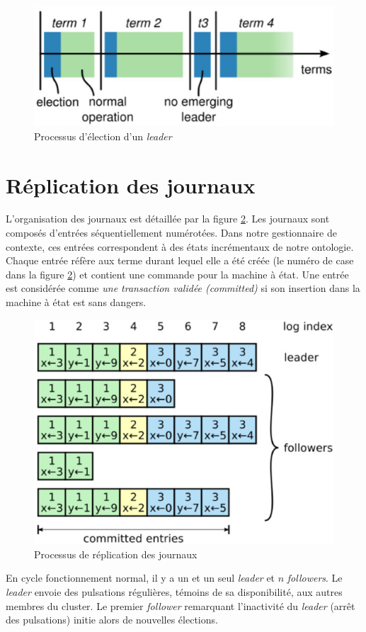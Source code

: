 \begin{figure}[H]
    \centerline{\includegraphics[width=.37\textwidth]{img/leader_election}}
    \caption{Processus d'élection d'un \emph{leader}}
    \label{fig:leader_election}
\end{figure}

\section{Réplication des journaux}

L'organisation des journaux est détaillée par la figure
\ref{fig:log_replication}.  Les journaux sont composés d'entrées
séquentiellement numérotées. Dans notre gestionnaire de contexte, ces entrées
correspondent à des états incrémentaux de notre ontologie. Chaque entrée réfère aux terme
durant lequel elle a été créée (le numéro de case dans la figure
\ref{fig:log_replication}) et contient une commande pour la machine à état. Une
entrée est considérée comme \emph{une transaction validée (committed)} si son
insertion dans la machine à état est sans dangers.

\begin{figure}[H]
    \centerline{\includegraphics[width=.37\textwidth]{img/log_replication}}
    \caption{Processus de réplication des journaux}
    \label{fig:log_replication}
\end{figure}

En cycle fonctionnement normal, il y a un et un seul \emph{leader} et $n$
\emph{followers}. Le \emph{leader} envoie des pulsations régulières, témoins de
sa disponibilité, aux autres membres du cluster. Le premier \emph{follower}
remarquant l'inactivité du \emph{leader} (arrêt des pulsations) initie alors de
nouvelles élections. 

